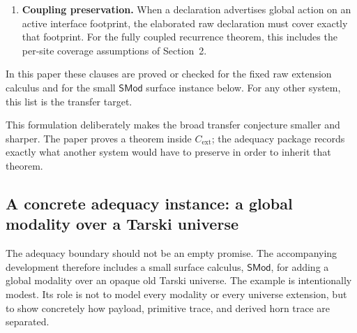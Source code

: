 \documentclass{lmcs}
\begin{document}
\begin{rem}
\begin{enumerate}
\item \textbf{Coupling preservation.}  When a declaration advertises global action on an
active interface footprint, the elaborated raw declaration must cover exactly that footprint.
For the fully coupled recurrence theorem, this includes the per-site coverage assumptions of
Section~2.
\end{enumerate}

In this paper these clauses are proved or checked for the fixed raw extension calculus and
for the small \(\mathsf{SMod}\) surface instance below.  For any other system, this list is the
transfer target.
\end{rem}

This formulation deliberately makes the broad transfer conjecture smaller and sharper.  The
paper proves a theorem inside \(C_{\mathrm{ext}}\); the adequacy package records exactly what
another system would have to preserve in order to inherit that theorem.

\subsection{A concrete adequacy instance: a global modality over a Tarski universe}

The adequacy boundary should not be an empty promise.  The accompanying development
therefore includes a small surface calculus, \(\mathsf{SMod}\), for adding a global modality
over an opaque old Tarski universe.  The example is intentionally modest.  Its role is not to
model every modality or every universe extension, but to show concretely how payload,
primitive trace, and derived horn trace are separated.
\end{document}

